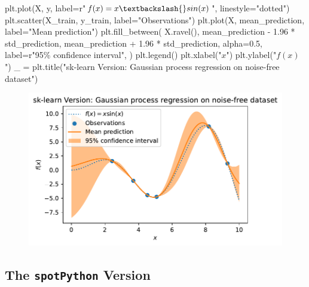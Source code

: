 \documentclass[
  letterpaper,
  DIV=11,
  numbers=noendperiod]{scrreprt}
\newenvironment{Shaded}{\begin{snugshade}}{\end{snugshade}}
\newcommand{\FloatTok}[1]{\textcolor[rgb]{0.68,0.00,0.00}{#1}}
\newcommand{\NormalTok}[1]{\textcolor[rgb]{0.00,0.23,0.31}{#1}}
\newcommand{\OperatorTok}[1]{\textcolor[rgb]{0.37,0.37,0.37}{#1}}
\newcommand{\SpecialCharTok}[1]{\textcolor[rgb]{0.37,0.37,0.37}{#1}}
\newcommand{\StringTok}[1]{\textcolor[rgb]{0.13,0.47,0.30}{#1}}
\newcommand{\VerbatimStringTok}[1]{\textcolor[rgb]{0.13,0.47,0.30}{#1}}
\begin{document}
\begin{Shaded}
\begin{Highlighting}[]
\NormalTok{plt.plot(X, y, label}\OperatorTok{=}\VerbatimStringTok{r"$f(x) = x \textbackslash{}sin(x)$"}\NormalTok{, linestyle}\OperatorTok{=}\StringTok{"dotted"}\NormalTok{)}
\NormalTok{plt.scatter(X\_train, y\_train, label}\OperatorTok{=}\StringTok{"Observations"}\NormalTok{)}
\NormalTok{plt.plot(X, mean\_prediction, label}\OperatorTok{=}\StringTok{"Mean prediction"}\NormalTok{)}
\NormalTok{plt.fill\_between(}
\NormalTok{    X.ravel(),}
\NormalTok{    mean\_prediction }\OperatorTok{{-}} \FloatTok{1.96} \OperatorTok{*}\NormalTok{ std\_prediction,}
\NormalTok{    mean\_prediction }\OperatorTok{+} \FloatTok{1.96} \OperatorTok{*}\NormalTok{ std\_prediction,}
\NormalTok{    alpha}\OperatorTok{=}\FloatTok{0.5}\NormalTok{,}
\NormalTok{    label}\OperatorTok{=}\VerbatimStringTok{r"95}\SpecialCharTok{\% c}\VerbatimStringTok{onfidence interval"}\NormalTok{,}
\NormalTok{)}
\NormalTok{plt.legend()}
\NormalTok{plt.xlabel(}\StringTok{"$x$"}\NormalTok{)}
\NormalTok{plt.ylabel(}\StringTok{"$f(x)$"}\NormalTok{)}
\NormalTok{\_ }\OperatorTok{=}\NormalTok{ plt.title(}\StringTok{"sk{-}learn Version: Gaussian process regression on noise{-}free dataset"}\NormalTok{)}
\end{Highlighting}
\end{Shaded}

\begin{figure}[H]

{\centering \includegraphics{011_num_spot_sklearn_gaussian_files/figure-pdf/cell-5-output-1.pdf}

}

\end{figure}

\hypertarget{the-spotpython-version}{%
\subsection{\texorpdfstring{The \texttt{spotPython}
Version}{The spotPython Version}}\label{the-spotpython-version}}
\end{document}
